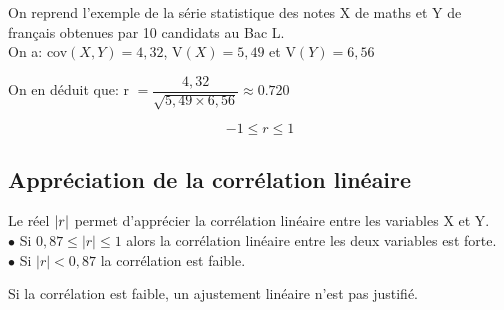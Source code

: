  \begin{example}

 On reprend  l'exemple  de la série statistique des notes X de maths et Y de français obtenues par 10 candidats au Bac L.\\
 
 On a:\; cov$ (X,Y)=4,32 $, \;  V$ (X)=5,49 $\; et \; V$ (Y)=6,56 $
 
 On en déduit que:\;  r $ = \dfrac{4,32}{\sqrt{5,49\times 6,56}}\approx0.720$
 
 \end{example}
 
 \begin{remark}
 
 
  $$ -1\leq r \leq 1 $$

 \end{remark}

\subsection*{ Appréciation de la corrélation linéaire }
Le réel $ \left\lvert r \right\rvert $ permet d'apprécier la corrélation
linéaire entre les variables X et Y.\\
  $ \bullet $  Si \; $ 0,87 \leq |r| \leq1  $ \;  alors la corrélation linéaire
entre les deux variables est forte.\\
 $ \bullet $ Si \; $ | r | < 0,87 $  \;  la corrélation est faible.
 
 
 \medskip

 \begin{remark}
 
  Si la corrélation est faible, un
ajustement linéaire n'est pas justifié.
 \end{remark}
   